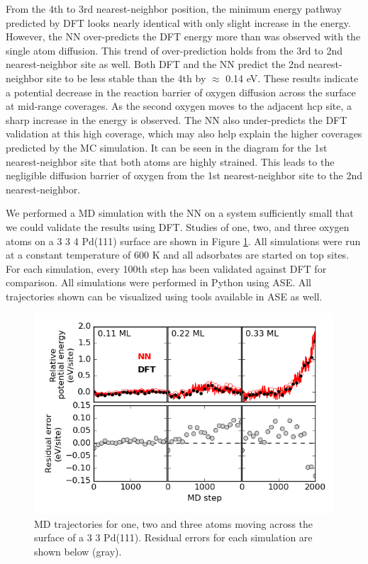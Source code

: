 \documentclass[12pt]{cmuthesis}
\begin{document}
From the 4th to 3rd nearest-neighbor position, the minimum energy pathway predicted by DFT looks nearly identical with only slight increase in the energy. However, the NN over-predicts the DFT energy more than was observed with the single atom diffusion. This trend of over-prediction holds from the 3rd to 2nd nearest-neighbor site as well. Both DFT and the NN predict the 2nd nearest-neighbor site to be less stable than the 4th by \(\approx\) 0.14 eV. These results indicate a potential decrease in the reaction barrier of oxygen diffusion across the surface at mid-range coverages. As the second oxygen moves to the adjacent hcp site, a sharp increase in the energy is observed. The NN also under-predicts the DFT validation at this high coverage, which may also help explain the higher coverages predicted by the MC simulation. It can be seen in the diagram for the 1st nearest-neighbor site that both atoms are highly strained. This leads to the negligible diffusion barrier of oxygen from the 1st nearest-neighbor site to the 2nd nearest-neighbor.

We performed a MD simulation with the NN on a system sufficiently small that we could validate the results using DFT. Studies of one, two, and three oxygen atoms on a 3 \texttimes{} 3 \texttimes{} 4 Pd(111) surface are shown in Figure \ref{fig-PdO-MD}. All simulations were run at a constant temperature of 600 K and all adsorbates are started on top sites. For each simulation, every 100th step has been validated against DFT for comparison. All simulations were performed in Python using ASE. All trajectories shown can be visualized using tools available in ASE as well.

\begin{figure}[htbp]
\centering
\includegraphics[width=5in]{./images/PdO-MD.png}
\caption{\label{fig-PdO-MD}
MD trajectories for one, two and three atoms moving across the surface of a 3 \texttimes{} 3 Pd(111). Residual errors for each simulation are shown below (gray).}
\end{figure}
\end{document}
